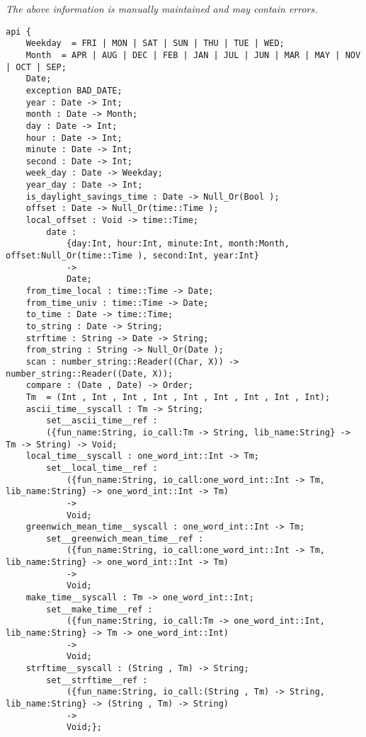 \label{api:Date}

{\tiny \it The above information is manually maintained and may contain errors.}
\begin{verbatim}
api {
    Weekday  = FRI | MON | SAT | SUN | THU | TUE | WED;
    Month  = APR | AUG | DEC | FEB | JAN | JUL | JUN | MAR | MAY | NOV | OCT | SEP;
    Date;
    exception BAD_DATE;
    year : Date -> Int;
    month : Date -> Month;
    day : Date -> Int;
    hour : Date -> Int;
    minute : Date -> Int;
    second : Date -> Int;
    week_day : Date -> Weekday;
    year_day : Date -> Int;
    is_daylight_savings_time : Date -> Null_Or(Bool );
    offset : Date -> Null_Or(time::Time );
    local_offset : Void -> time::Time;
        date :
            {day:Int, hour:Int, minute:Int, month:Month, offset:Null_Or(time::Time ), second:Int, year:Int}
            ->
            Date;
    from_time_local : time::Time -> Date;
    from_time_univ : time::Time -> Date;
    to_time : Date -> time::Time;
    to_string : Date -> String;
    strftime : String -> Date -> String;
    from_string : String -> Null_Or(Date );
    scan : number_string::Reader((Char, X)) -> number_string::Reader((Date, X));
    compare : (Date , Date) -> Order;
    Tm  = (Int , Int , Int , Int , Int , Int , Int , Int , Int);
    ascii_time__syscall : Tm -> String;
        set__ascii_time__ref :
        ({fun_name:String, io_call:Tm -> String, lib_name:String} -> Tm -> String) -> Void;
    local_time__syscall : one_word_int::Int -> Tm;
        set__local_time__ref :
            ({fun_name:String, io_call:one_word_int::Int -> Tm, lib_name:String} -> one_word_int::Int -> Tm)
            ->
            Void;
    greenwich_mean_time__syscall : one_word_int::Int -> Tm;
        set__greenwich_mean_time__ref :
            ({fun_name:String, io_call:one_word_int::Int -> Tm, lib_name:String} -> one_word_int::Int -> Tm)
            ->
            Void;
    make_time__syscall : Tm -> one_word_int::Int;
        set__make_time__ref :
            ({fun_name:String, io_call:Tm -> one_word_int::Int, lib_name:String} -> Tm -> one_word_int::Int)
            ->
            Void;
    strftime__syscall : (String , Tm) -> String;
        set__strftime__ref :
            ({fun_name:String, io_call:(String , Tm) -> String, lib_name:String} -> (String , Tm) -> String)
            ->
            Void;};
\end{verbatim}
